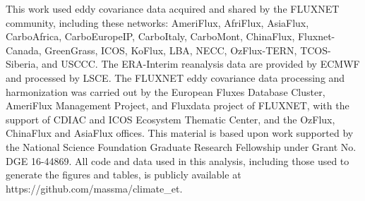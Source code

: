 \documentclass[draft,linenumbers]{agujournal}
\begin{document}
\acknowledgments This work used eddy covariance data acquired and
shared by the FLUXNET community, including these networks: AmeriFlux,
AfriFlux, AsiaFlux, CarboAfrica, CarboEuropeIP, CarboItaly, CarboMont,
ChinaFlux, Fluxnet-Canada, GreenGrass, ICOS, KoFlux, LBA, NECC,
OzFlux-TERN, TCOS-Siberia, and USCCC. The ERA-Interim reanalysis data
are provided by ECMWF and processed by LSCE. The FLUXNET eddy
covariance data processing and harmonization was carried out by the
European Fluxes Database Cluster, AmeriFlux Management Project, and
Fluxdata project of FLUXNET, with the support of CDIAC and ICOS
Ecosystem Thematic Center, and the OzFlux, ChinaFlux and AsiaFlux
offices. This material is based upon work supported by the National
Science Foundation Graduate Research Fellowship under Grant No. DGE
16-44869. All code and data used in this analysis, including those
used to generate the figures and tables, is publicly available at
https://github.com/massma/climate\_et.



\end{document}
